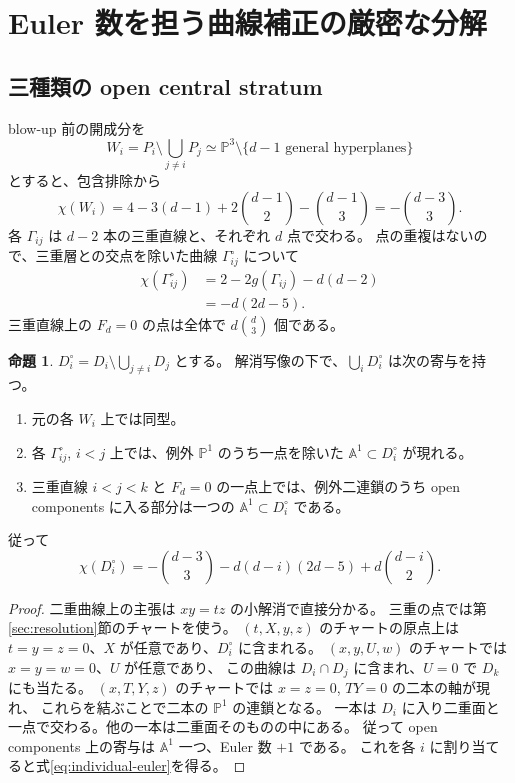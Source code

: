 \documentclass[11pt,a4paper]{article}
\theoremstyle{definition}
\newtheorem{proposition}[theorem]{命題}
\newcommand{\PP}{\mathbb P}
\begin{document}
\section{Euler 数を担う曲線補正の厳密な分解}\label{sec:euler}

\subsection{三種類の open central stratum}

blow-up 前の開成分を
\[
W_i=P_i\setminus\bigcup_{j\ne i}P_j
\simeq\PP^3\setminus\{d-1\text{ general hyperplanes}\}
\]
とすると、包含排除から
\begin{equation}\label{eq:core-euler}
\chi(W_i)=4-3(d-1)+2\binom{d-1}{2}-\binom{d-1}{3}
=-\binom{d-3}{3}.
\end{equation}
各 $\Gamma_{ij}$ は $d-2$ 本の三重直線と、それぞれ $d$ 点で交わる。
点の重複はないので、三重層との交点を除いた曲線 $\Gamma_{ij}^{\circ}$ について
\begin{align}
\chi(\Gamma_{ij}^{\circ})
&=2-2g(\Gamma_{ij})-d(d-2)\nonumber\\
&=-d(2d-5).\label{eq:gamma-open}
\end{align}
三重直線上の $F_d=0$ の点は全体で $d\binom d3$ 個である。

\begin{proposition}\label{prop:euler-exception}
$D_i^\circ=D_i\setminus\bigcup_{j\ne i}D_j$ とする。
解消写像の下で、$\bigcup_iD_i^\circ$ は次の寄与を持つ。
\begin{enumerate}
\item 元の各 $W_i$ 上では同型。
\item 各 $\Gamma_{ij}^{\circ}$, $i<j$ 上では、例外 $\PP^1$ のうち一点を除いた
$\mathbb A^1\subset D_i^\circ$ が現れる。
\item 三重直線 $i<j<k$ と $F_d=0$ の一点上では、例外二連鎖のうち open components
に入る部分は一つの $\mathbb A^1\subset D_i^\circ$ である。
\end{enumerate}
従って
\begin{equation}\label{eq:individual-euler}
\chi(D_i^\circ)=-\binom{d-3}{3}
-d(d-i)(2d-5)+d\binom{d-i}{2}.
\end{equation}
\end{proposition}

\begin{proof}
二重曲線上の主張は $xy=tz$ の小解消で直接分かる。
三重の点では第\ref{sec:resolution}節のチャートを使う。
$(t,X,y,z)$ のチャートの原点上は $t=y=z=0$、$X$ が任意であり、$D_i^\circ$ に含まれる。
$(x,y,U,w)$ のチャートでは $x=y=w=0$、$U$ が任意であり、
この曲線は $D_i\cap D_j$ に含まれ、$U=0$ で $D_k$ にも当たる。
$(x,T,Y,z)$ のチャートでは $x=z=0$, $TY=0$ の二本の軸が現れ、
これらを結ぶことで二本の $\PP^1$ の連鎖となる。
一本は $D_i$ に入り二重面と一点で交わる。他の一本は二重面そのものの中にある。
従って open components 上の寄与は $\mathbb A^1$ 一つ、Euler 数 $+1$ である。
これを各 $i$ に割り当てると式\eqref{eq:individual-euler}を得る。
\end{proof}
\end{document}
